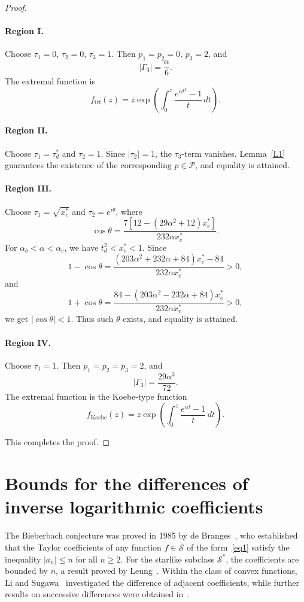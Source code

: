 \documentclass[10pt,a4paper]{amsart}
\numberwithin{equation}{section}
\begin{document}
\begin{proof}
\paragraph{Region I.}
Choose $\tau_1=0$, $\tau_2=0$, $\tau_3=1$. Then $p_1=p_2=0$, $p_3=2$, and
\[
|\Gamma_3|=\frac{\alpha}{6}.
\]
The extremal function is
\[
f_{\mathrm{tri}}(z)
=
z\exp\left(
\int_0^z \frac{e^{\alpha t^3}-1}{t}\,dt
\right).
\]

\paragraph{Region II.}
Choose $\tau_1=\tau_d^*$ and $\tau_2=1$. Since $|\tau_2|=1$, the $\tau_3$-term vanishes. Lemma~\ref{L1} guarantees the existence of the corresponding $p\in\mathcal{P}$, and equality is attained.

\paragraph{Region III.}
Choose $\tau_1=\sqrt{x_e^*}$ and $\tau_2=e^{i\theta}$, where
\[
\cos\theta
=
\frac{7\left[12-(29\alpha^2+12)x_e^*\right]}
{232\alpha x_e^*}.
\]
For $\alpha_b<\alpha<\alpha_c$, we have $t_d^2<x_e^*<1$. Since
\[
1-\cos\theta
=
\frac{
(203\alpha^2+232\alpha+84)x_e^*-84
}
{232\alpha x_e^*}
>0,
\]
and
\[
1+\cos\theta
=
\frac{
84-(203\alpha^2-232\alpha+84)x_e^*
}
{232\alpha x_e^*}
>0,
\]
we get $|\cos\theta|<1$. Thus such $\theta$ exists, and equality is attained.

\paragraph{Region IV.}
Choose $\tau_1=1$. Then $p_1=p_2=p_3=2$, and
\[
|\Gamma_3|=\frac{29\alpha^3}{72}.
\]
The extremal function is the Koebe-type function
\[
f_{\mathrm{Koebe}}(z)
=
z\exp\left(
\int_0^z \frac{e^{\alpha t}-1}{t}\,dt
\right).
\]

This completes the proof.
\end{proof}

\section{Bounds for the differences of inverse logarithmic coefficients}
The Bieberbach conjecture was proved in 1985 by de Branges~\cite{LDB1}, who established that the Taylor coefficients of any function $f \in \mathcal{S}$ of the form~\eqref{eq1} satisfy the inequality $|a_n| \le n$ for all $n \ge 2$. For the starlike subclass $\mathcal{S}^\ast$, the coefficients are bounded by $n$, a result proved by Leung~\cite{Leung1978}. Within the class of convex functions, Li and Sugawa~\cite{LiSugawa} investigated the difference of adjacent coefficients, while further results on successive differences were obtained in~\cite{Peng2019, Arora2019, Arora2022, Arora2023}.
\end{document}
